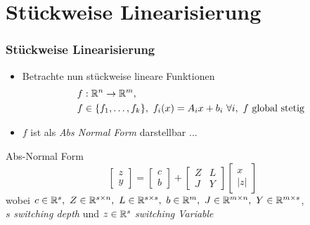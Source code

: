 \section[Problemstellung]{Stückweise Linearisierung}
\begin{frame}[<+->]
\frametitle{Stückweise Linearisierung}
\begin{itemize}
\item Betrachte nun stückweise lineare Funktionen 
\[
\begin{aligned}
 f&:\mathbb R^n \to \mathbb R^m, \\
 f&\in \lbrace f_1,\ldots,f_k\rbrace,~f_i(x)=A_ix+b_i~\forall i,~f \text{ global stetig}
 \end{aligned}
\]
 \item $f$ ist als \textit{Abs Normal Form} darstellbar $\ldots$
 \end{itemize}
\begin{block}{Abs-Normal Form}
 \begin{equation}
\label{eq:absNormalForm}
  \begin{bmatrix}
   z\\y
  \end{bmatrix}
  =
  \begin{bmatrix}
   c\\b
  \end{bmatrix}
  +
  \begin{bmatrix}
   Z & L\\
   J & Y
  \end{bmatrix}
  \begin{bmatrix}
   x\\|z|
  \end{bmatrix}
 \end{equation}
wobei $c\in \mathbb R^s, ~ Z\in \mathbb R^{s\times n},~ L\in\mathbb R^{s\times s}, ~ b\in\mathbb R^m, ~ J\in\mathbb R^{m\times n}, ~ Y\in \mathbb R^{m\times s}$,\\
$s$ \textit{switching depth} und $z\in \mathbb R^s$ \textit{switching Variable}
\end{block}
\end{frame}

